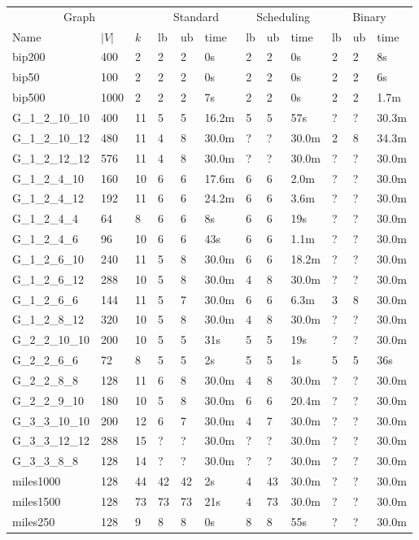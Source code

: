 \centering
\begin{longtable}{|lll|lll|lll|lll|}
\hline
\multicolumn{3}{|c|}{Graph}&\multicolumn{3}{c|}{Standard}&\multicolumn{3}{c|}{Scheduling} &\multicolumn{3}{c|}{Binary}\\
Name&$|V|$&$k$&lb&ub&time&lb&ub&time&lb&ub&time\\
\hline
bip200&400&2&2&2&0s&2&2&0s&2&2&8s\\
\hline
bip50&100&2&2&2&0s&2&2&0s&2&2&6s\\
\hline
bip500&1000&2&2&2&7s&2&2&0s&2&2&1.7m\\
\hline
G\_1\_2\_10\_10&400&11&5&5&16.2m&5&5&57s&?&?&30.3m\\
\hline
G\_1\_2\_10\_12&480&11&4&8&30.0m&?&?&30.0m&2&8&34.3m\\
\hline
G\_1\_2\_12\_12&576&11&4&8&30.0m&?&?&30.0m&?&?&30.0m\\
\hline
G\_1\_2\_4\_10&160&10&6&6&17.6m&6&6&2.0m&?&?&30.0m\\
\hline
G\_1\_2\_4\_12&192&11&6&6&24.2m&6&6&3.6m&?&?&30.0m\\
\hline
G\_1\_2\_4\_4&64&8&6&6&8s&6&6&19s&?&?&30.0m\\
\hline
G\_1\_2\_4\_6&96&10&6&6&43s&6&6&1.1m&?&?&30.0m\\
\hline
G\_1\_2\_6\_10&240&11&5&8&30.0m&6&6&18.2m&?&?&30.0m\\
\hline
G\_1\_2\_6\_12&288&10&5&8&30.0m&4&8&30.0m&?&?&30.0m\\
\hline
G\_1\_2\_6\_6&144&11&5&7&30.0m&6&6&6.3m&3&8&30.0m\\
\hline
G\_1\_2\_8\_12&320&10&5&8&30.0m&4&8&30.0m&?&?&30.0m\\
\hline
G\_2\_2\_10\_10&200&10&5&5&31s&5&5&19s&?&?&30.0m\\
\hline
G\_2\_2\_6\_6&72&8&5&5&2s&5&5&1s&5&5&36s\\
\hline
G\_2\_2\_8\_8&128&11&6&8&30.0m&4&8&30.0m&?&?&30.0m\\
\hline
G\_2\_2\_9\_10&180&10&5&8&30.0m&6&6&20.4m&?&?&30.0m\\
\hline
G\_3\_3\_10\_10&200&12&6&7&30.0m&4&7&30.0m&?&?&30.0m\\
\hline
G\_3\_3\_12\_12&288&15&?&?&30.0m&?&?&30.0m&?&?&30.0m\\
\hline
G\_3\_3\_8\_8&128&14&?&?&30.0m&?&?&30.0m&?&?&30.0m\\
\hline
miles1000&128&44&42&42&2s&4&43&30.0m&?&?&30.0m\\
\hline
miles1500&128&73&73&73&21s&4&73&30.0m&?&?&30.0m\\
\hline
miles250&128&9&8&8&0s&8&8&55s&?&?&30.0m\\

\end{longtable}
